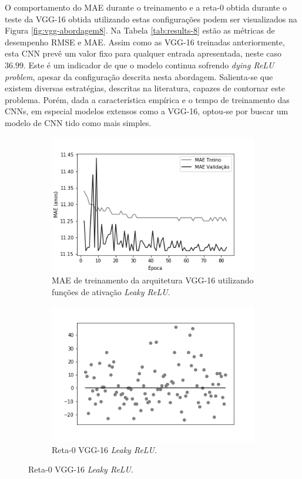  O comportamento do MAE durante o treinamento e a reta-0 obtida durante o teste da VGG-16 obtida utilizando estas configurações podem ser visualizados na Figura \ref{fig:vgg-abordagem8}. Na Tabela \ref{tab:results-8} estão as métricas de desempenho RMSE e MAE. Assim como as VGG-16 treinadas anteriormente, esta CNN prevê um valor fixo para qualquer entrada apresentada, neste caso $36.99$. Este é um indicador de que o modelo continua sofrendo \emph{dying ReLU problem}, apesar da configuração descrita nesta abordagem. Salienta-se que existem diversas estratégias, descritas na literatura, capazes de contornar este problema. Porém, dada a característica empírica e o tempo de treinamento das CNNs, em especial modelos extensos como a VGG-16, optou-se por buscar um modelo de CNN tido como mais simples.

 \begin{figure}[h!]
	 \caption{Resultados do treinamento e teste da CNN VGG-16 de acordo com a Abordagem 8.}\label{fig:vgg-abordagem8}
	 \begin{subfigure}[hb]{0.5\linewidth}
		 \caption{MAE de treinamento da arquitetura VGG-16 utilizando funções de ativação \emph{Leaky ReLU}.}
		 \includegraphics[width=\linewidth]{img/graficos/history/vgg16/fig-history-abordagem9-vgg16-lrelu-mae.png}%
	 \end{subfigure}%
	 \begin{subfigure}[hb]{0.5\linewidth}
		 \caption{Reta-0 VGG-16 \emph{Leaky ReLU}.}
		 \includegraphics[width=\linewidth]{img/graficos/reta0/vgg16/fig-reta-0-abordagem9-vgg16-lrelu.png}%

\end{subfigure}
\end{figure}
